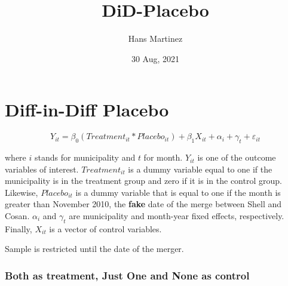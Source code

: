 \documentclass[
]{article}
\title{DiD-Placebo}
\author{Hans Martinez}
\date{30 Aug, 2021}
\begin{document}
\maketitle

\hypertarget{diff-in-diff-placebo}{%
\section{Diff-in-Diff Placebo}\label{diff-in-diff-placebo}}

\begin{equation}
  Y_{it}=\beta_{0}(Treatment_{it}*Placebo_{it}) + \beta_1 X_{it} + \alpha_{i} + \gamma_{t}  + \varepsilon_{it}
\end{equation}

where \(i\) stands for municipality and \(t\) for month. \(Y_{it}\) is
one of the outcome variables of interest. \(Treatment_{it}\) is a dummy
variable equal to one if the municipality is in the treatment group and
zero if it is in the control group. Likewise, \(Placebo_{it}\) is a
dummy variable that is equal to one if the month is greater than
November 2010, the \textbf{fake} date of the merge between Shell and
Cosan. \(\alpha_i\) and \(\gamma_t\) are municipality and month-year
fixed effects, respectively. Finally, \(X_{it}\) is a vector of control
variables.

Sample is restricted until the date of the merger.

\hypertarget{both-as-treatment-just-one-and-none-as-control}{%
\subsubsection{Both as treatment, Just One and None as
control}\label{both-as-treatment-just-one-and-none-as-control}}
\end{document}
